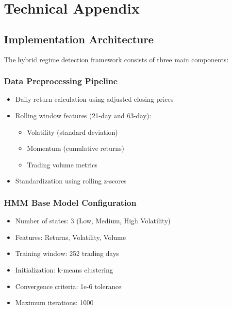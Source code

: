 \appendix
\section{Technical Appendix}

\subsection{Implementation Architecture}
The hybrid regime detection framework consists of three main components:

\subsubsection{Data Preprocessing Pipeline}
\begin{itemize}
    \item Daily return calculation using adjusted closing prices
    \item Rolling window features (21-day and 63-day):
        \begin{itemize}
            \item Volatility (standard deviation)
            \item Momentum (cumulative returns)
            \item Trading volume metrics
        \end{itemize}
    \item Standardization using rolling z-scores
\end{itemize}

\subsubsection{HMM Base Model Configuration}
\begin{itemize}
    \item Number of states: 3 (Low, Medium, High Volatility)
    \item Features: Returns, Volatility, Volume
    \item Training window: 252 trading days
    \item Initialization: k-means clustering
    \item Convergence criteria: 1e-6 tolerance
    \item Maximum iterations: 1000
\end{itemize}

